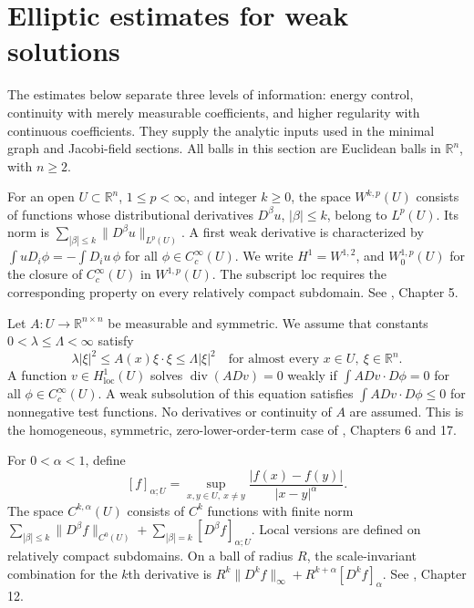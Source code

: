 \chapter{Elliptic estimates for weak solutions}\label{sec:elliptic-tools}
The estimates below separate three levels of information: energy control, continuity with merely measurable coefficients, and higher regularity with continuous coefficients. They supply the analytic inputs used in the minimal graph and Jacobi-field sections. All balls in this section are Euclidean balls in $\mathbb R^n$, with $n\geq2$.

\begin{definition}\label{def:sobolev-weak-derivatives}
For an open $U\subset\mathbb R^n$, $1\leq p<\infty$, and integer $k\geq0$, the space $W^{k,p}(U)$ consists of functions whose distributional derivatives $D^\beta u$, $|\beta|\leq k$, belong to $L^p(U)$. Its norm is $\sum_{|\beta|\leq k}\|D^\beta u\|_{L^p(U)}$. A first weak derivative is characterized by $\int uD_i\phi=-\int D_i u\,\phi$ for all $\phi\in C_c^\infty(U)$. We write $H^1=W^{1,2}$, and $W^{1,p}_0(U)$ for the closure of $C_c^\infty(U)$ in $W^{1,p}(U)$. The subscript $\mathrm{loc}$ requires the corresponding property on every relatively compact subdomain. See \cite{SimonPDE}, Chapter 5.
\end{definition}

\begin{definition}\label{def:weak-elliptic-equation}
Let $A:U\to\mathbb R^{n\times n}$ be measurable and symmetric. We assume that constants $0<\lambda\leq\Lambda<\infty$ satisfy
\[
 \lambda|\xi|^2\leq A(x)\xi\cdot\xi\leq\Lambda|\xi|^2
 \quad\text{for almost every }x\in U,\ \xi\in\mathbb R^n.
\]
A function $v\in H^1_{\mathrm{loc}}(U)$ solves $\operatorname{div}(A Dv)=0$ weakly if $\int A Dv\cdot D\phi=0$ for all $\phi\in C_c^\infty(U)$. A weak subsolution of this equation satisfies $\int A Dv\cdot D\phi\leq0$ for nonnegative test functions. No derivatives or continuity of $A$ are assumed. This is the homogeneous, symmetric, zero-lower-order-term case of \cite{SimonPDE}, Chapters 6 and 17.
\end{definition}

\begin{definition}\label{def:holder-seminorm}
For $0<\alpha<1$, define
\[
 [f]_{\alpha;U}=\sup_{x,y\in U,\ x\ne y}\frac{|f(x)-f(y)|}{|x-y|^\alpha}.
\]
The space $C^{k,\alpha}(U)$ consists of $C^k$ functions with finite norm $\sum_{|\beta|\leq k}\|D^\beta f\|_{C^0(U)}+\sum_{|\beta|=k}[D^\beta f]_{\alpha;U}$. Local versions are defined on relatively compact subdomains. On a ball of radius $R$, the scale-invariant combination for the $k$th derivative is $R^k\|D^kf\|_\infty+R^{k+\alpha}[D^kf]_\alpha$. See \cite{SimonPDE}, Chapter 12.
\end{definition}

